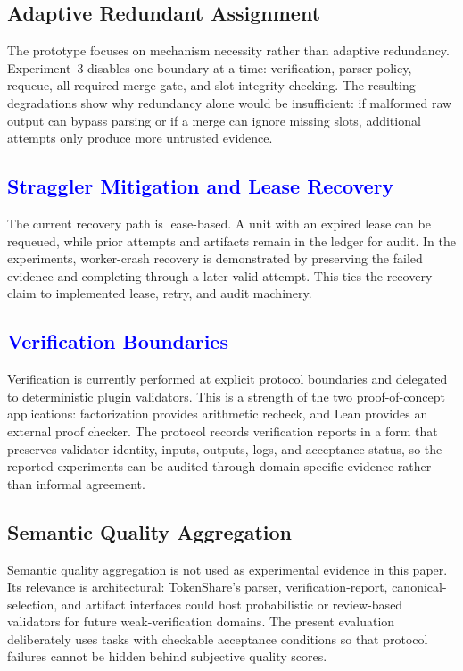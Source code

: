 \documentclass{article}
\theoremstyle{plain}
\begin{document}
\subsection{Adaptive Redundant Assignment}

{\color{blue}
The prototype focuses on mechanism necessity rather than adaptive redundancy. Experiment~3 disables one boundary at a time: verification, parser policy, requeue, all-required merge gate, and slot-integrity checking. The resulting degradations show why redundancy alone would be insufficient: if malformed raw output can bypass parsing or if a merge can ignore missing slots, additional attempts only produce more untrusted evidence.
}

\subsection{\textcolor{blue}{Straggler Mitigation and Lease Recovery}}

{\color{blue}
The current recovery path is lease-based. A unit with an expired lease can be requeued, while prior attempts and artifacts remain in the ledger for audit. In the experiments, worker-crash recovery is demonstrated by preserving the failed evidence and completing through a later valid attempt. This ties the recovery claim to implemented lease, retry, and audit machinery.
}

\subsection{\textcolor{blue}{Verification Boundaries}}

{\color{blue}
Verification is currently performed at explicit protocol boundaries and delegated to deterministic plugin validators. This is a strength of the two proof-of-concept applications: factorization provides arithmetic recheck, and Lean provides an external proof checker. The protocol records verification reports in a form that preserves validator identity, inputs, outputs, logs, and acceptance status, so the reported experiments can be audited through domain-specific evidence rather than informal agreement.
}

\subsection{Semantic Quality Aggregation}

{\color{blue}
Semantic quality aggregation is not used as experimental evidence in this paper. Its relevance is architectural: TokenShare's parser, verification-report, canonical-selection, and artifact interfaces could host probabilistic or review-based validators for future weak-verification domains. The present evaluation deliberately uses tasks with checkable acceptance conditions so that protocol failures cannot be hidden behind subjective quality scores.
}
\end{document}
